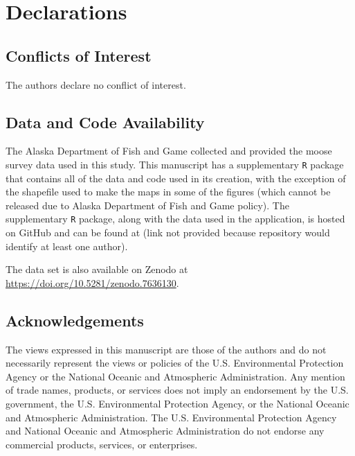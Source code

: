 \documentclass[smallextended]{svjour3}       %
\begin{document}
\hypertarget{declarations}{%
\section{Declarations}\label{declarations}}

\hypertarget{conflicts-of-interest}{%
\subsection*{Conflicts of Interest}\label{conflicts-of-interest}}

The authors declare no conflict of interest.

\hypertarget{data-and-code-availability}{%
\subsection*{Data and Code
Availability}\label{data-and-code-availability}}

The Alaska Department of Fish and Game collected and provided the moose
survey data used in this study. This manuscript has a supplementary
\texttt{R} package that contains all of the data and code used in its
creation, with the exception of the shapefile used to make the maps in
some of the figures (which cannot be released due to Alaska Department
of Fish and Game policy). The supplementary \texttt{R} package, along
with the data used in the application, is hosted on GitHub and can be
found at (link not provided because repository would identify at least
one author).

The data set is also available on Zenodo at
\url{https://doi.org/10.5281/zenodo.7636130}.

\hypertarget{acknowledgements}{%
\subsection*{Acknowledgements}\label{acknowledgements}}

The views expressed in this manuscript are those of the authors and do
not necessarily represent the views or policies of the U.S.
Environmental Protection Agency or the National Oceanic and Atmospheric
Administration. Any mention of trade names, products, or services does
not imply an endorsement by the U.S. government, the U.S. Environmental
Protection Agency, or the National Oceanic and Atmospheric
Administration. The U.S. Environmental Protection Agency and National
Oceanic and Atmospheric Administration do not endorse any commercial
products, services, or enterprises.
\end{document}
